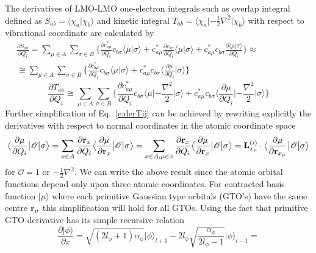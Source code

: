 \documentclass[a4paper,titlepage,twoside,fleqn,12pt]{book}
\newcommand{\ket}[1]{\ensuremath{\bigr\rvert {#1} \bigr\rangle}}
\newcommand{\braket}[2]{\ensuremath{\bigl\langle {#1} \bigl\lvert {#2} \bigr\rangle}}
\newcommand{\tbraket}[3]{\ensuremath{\bigl\langle {#1} \bigl\lvert {#2} \bigl\lvert {#3} \bigr\rangle}}
\newcommand{\fderiv}[2]{\ensuremath{
    \frac{\partial #1}{\partial #2}}}
\begin{document}
\begin{refsection}
The derivatives of LMO-LMO one-electron integrals 
such as overlap integral defined as $S_{ab}=\langle \chi_a\vert\chi_b\rangle$ 
and kinetic integral 
$T_{ab}=\langle \chi_a\lvert-\frac{1}{2}\nabla^2\rvert\chi_b\rangle$
with respect to vibrational coordinate are calculated by
%
\begin{multline}\label{e:derSij}
\fderiv{S_{ab}}{Q_i} = 
\sum_{\mu \in A} \sum_{\sigma \in B} 
\Big\{
\fderiv{c_{a\mu}^*}{Q_i} c_{b\sigma} \braket{\mu}{\sigma} +
c_{a\mu}^* \fderiv{c_{b\sigma}}{Q_i} \braket{\mu}{\sigma} + 
c_{a\mu}^* c_{b\sigma}  \fderiv{\braket{\mu}{\sigma}}{Q_i}
\Big\}
\approx \\ \cong
\sum_{\mu \in A} \sum_{\sigma \in B} 
\Big\{
\fderiv{c_{a\mu}^*}{Q_i} c_{b\sigma} \braket{\mu}{\sigma} +
c_{a\mu}^* c_{b\sigma}   \braket{\fderiv{\mu}{Q_i}}{\sigma}
\Big\}
\quad\quad\quad\quad\quad\quad\quad\quad\quad\quad\quad\quad\quad
\end{multline}
%
\begin{equation}\label{e:derTij}
\fderiv{T_{ab}}{Q_i}  \cong
\sum_{\mu \in A} \sum_{\sigma \in B} 
\Big\{
\fderiv{c_{a\mu}^*}{Q_i} c_{b\sigma} \tbraket{\mu}{ -\frac{\nabla^2}{2} }{\sigma} +
c_{a\mu}^* c_{b\sigma}   \tbraket{\fderiv{\mu}{Q_i}}{ -\frac{\nabla^2}{2} }{\sigma}
\Big\}
\end{equation}
%
Further simplification of Eq.~\eqref{e:derTij} 
can be achieved by rewriting explicitly the derivatives 
with respect to normal coordinates in the atomic coordinate space 
%
\begin{equation}\label{e:derXij}
\tbraket{\fderiv{\mu}{Q_i}}{ \mathscr{O} }{\sigma} = 
\sum_{x \in A} \fderiv{{\bf r}_x}{Q_i} \tbraket{\fderiv{\mu}{{\bf r}_x}}{ \mathscr{O} }{\sigma} =
\sum_{x \in A, \mu \in x} \fderiv{{\bf r}_x}{Q_i} \tbraket{\fderiv{\mu}{{\bf r}_x}}{ \mathscr{O} }{\sigma} =
{\bf L}^{(i)}_{x_\mu} \cdot \tbraket{\fderiv{\mu}{{\bf r}_{x_\mu}}}{ \mathscr{O} }{\sigma}
\end{equation}
%
for $\mathscr{O}=1$ or $-\frac{1}{2}\nabla^2$.
We can write the above result since the atomic orbital functions depend only upon three atomic coordinates. For contracted 
basis function $\ket{\mu}$ where each primitive Gaussian type orbitals (GTO's) have the same centre
${\bf r}_\mu$ this simplification will hold for all GTOs. Using the fact that primitive GTO derivative
has its simple recursive relation
%
\begin{equation}\label{e:orbder}
\fderiv{\ket{\phi}} {x} = 
\sqrt{\left( 2l_\phi + 1 \right)\alpha_\phi} \ket{\phi}_{l+1} -
2l_\phi \sqrt{\frac{\alpha_\phi}{2l_\phi-1}} \ket{\phi}_{l-1} =

\end{equation}
\end{refsection}
\end{document}
